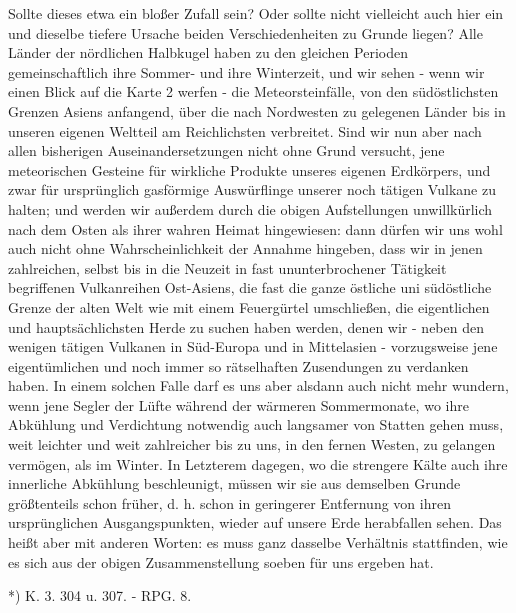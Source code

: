 \documentclass[a4paper, 11pt, oneside, polutonikogreek, german]{article}
\begin{document}
Sollte dieses etwa ein bloßer Zufall sein? Oder sollte nicht vielleicht auch hier ein und dieselbe tiefere Ursache beiden Verschiedenheiten zu Grunde liegen? Alle Länder der nördlichen Halbkugel haben zu den gleichen Perioden gemeinschaftlich ihre Sommer- und ihre Winterzeit, und wir sehen - wenn wir einen Blick auf die Karte 2 werfen - die Meteorsteinfälle, von den südöstlichsten Grenzen Asiens anfangend, über die nach Nordwesten zu gelegenen Länder bis in unseren eigenen Weltteil am Reichlichsten verbreitet. Sind wir nun aber nach allen bisherigen Auseinandersetzungen nicht ohne Grund versucht, jene meteorischen Gesteine für wirkliche Produkte unseres eigenen Erdkörpers, und zwar für ursprünglich gasförmige Auswürflinge unserer noch tätigen Vulkane zu halten; und werden wir außerdem durch die obigen Aufstellungen unwillkürlich nach dem Osten als ihrer wahren Heimat hingewiesen: dann dürfen wir uns wohl auch nicht ohne Wahrscheinlichkeit der Annahme hingeben, dass wir in jenen zahlreichen, selbst bis in die Neuzeit in fast ununterbrochener Tätigkeit begriffenen Vulkanreihen Ost-Asiens, die fast die ganze östliche uni südöstliche Grenze der alten Welt wie mit einem Feuergürtel umschließen, die eigentlichen und hauptsächlichsten Herde zu suchen haben werden, denen wir - neben den wenigen tätigen Vulkanen in Süd-Europa und in Mittelasien - vorzugsweise jene eigentümlichen und noch immer so rätselhaften Zusendungen zu verdanken haben. In einem solchen Falle darf es uns aber alsdann auch nicht mehr wundern, wenn jene Segler der Lüfte während der wärmeren Sommermonate, wo ihre Abkühlung und Verdichtung notwendig auch langsamer von Statten gehen muss, weit leichter und weit zahlreicher bis zu uns, in den fernen Westen, zu gelangen vermögen, als im Winter. In Letzterem dagegen, wo die strengere Kälte auch ihre innerliche Abkühlung beschleunigt, müssen wir sie aus demselben Grunde größtenteils schon früher, d. h. schon in geringerer Entfernung von ihren ursprünglichen Ausgangspunkten, wieder auf unsere Erde herabfallen sehen. Das heißt aber mit anderen Worten: es muss ganz dasselbe Verhältnis stattfinden, wie es sich aus der obigen Zusammenstellung soeben für uns ergeben hat.

*) K. 3. 304 u. 307. - RPG. 8.
\end{document}
